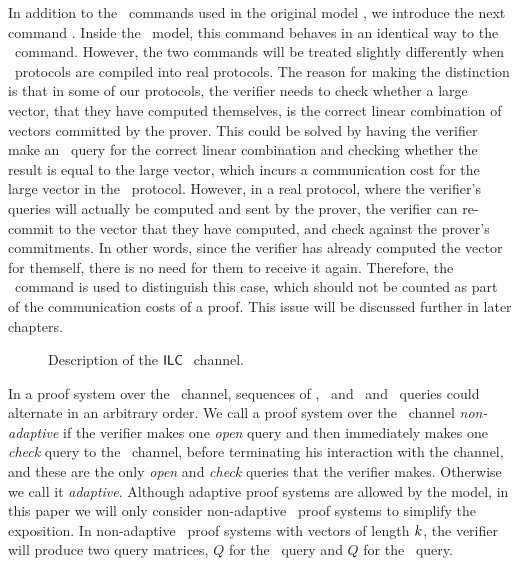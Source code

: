 In addition to the \ILC\ commands used in the original model \cite{BootleCGGHJ17}, we introduce the next command \ILCcheck. Inside the \ILC \ model, this command behaves in an identical way to the \ILCsend\ command. However, the two commands will be treated slightly differently when \ILC\ protocols are compiled into real protocols. The reason for making the distinction is that in some of our protocols, the verifier needs to check whether a large vector, that they have computed themselves, is the correct linear combination of vectors committed by the prover. This could be solved by having the verifier make an \ILCsend\ query for the correct linear combination and checking whether the result is equal to the large vector, which incurs a communication cost for the large vector in the \ILC\ protocol. However, in a real protocol, where the verifier's queries will actually be computed and sent by the prover, the verifier can re-commit to the vector that they have computed, and check against the prover's commitments. In other words, since the verifier has already computed the vector for themself, there is no need for them to receive it again. Therefore, the \ILCcheck\ command is used to distinguish this case, which should not be counted as part of the communication costs of a proof. This issue will be discussed further in later chapters.

\begin{figure}[htb]
\caption{Description of the $\mathsf{ILC}~$ channel.}\label{ILCSyntaxFigure11}
\end{figure}

In a proof system over the \ILC\ channel, sequences of \ILCcommit, \ILCsend\ and \ILCopen\ and \ILCcheck\ queries could alternate in an arbitrary order. We call a proof system over the \ILC\ channel \emph{non-adaptive} if the verifier makes one \emph{open} query and then immediately makes one \emph{check} query to the \ILC\ channel, before terminating his interaction with the channel, and these are the only \emph{open} and \emph{check} queries that the verifier makes. Otherwise we call it \emph{adaptive}. Although adaptive proof systems are allowed by the model, in this paper we will only consider non-adaptive \ILC\ proof systems to simplify the exposition. In non-adaptive \ILC\ proof systems with vectors of length $k$, the verifier will produce two query matrices, $Q$ for the \ILCopen\ query and $Q$ for the \ILCcheck\ query. 

